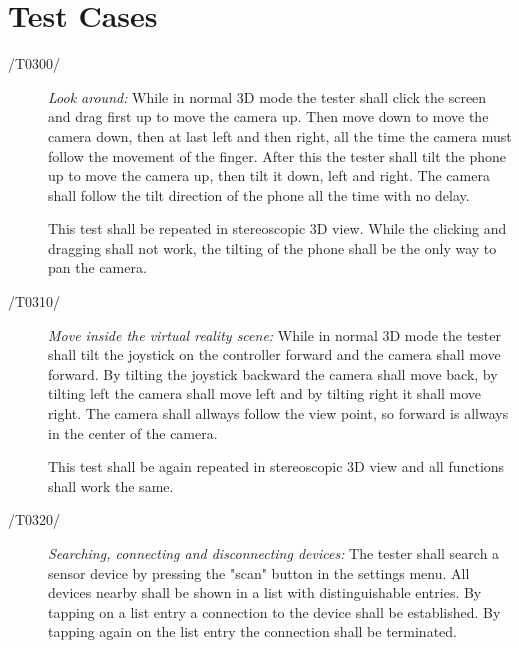 \section{Test Cases}





\begin{description}
  \item[/T0300/]
    \textit{Look around:} While in normal 3D mode the tester shall click the screen and drag first up to move the camera up.
    Then move down to move the camera down, then at last left and then right, all the time the camera must follow the movement of the finger.
    After this the tester shall tilt the phone up to move the camera up, then tilt it down, left and right. The camera shall follow the tilt direction of the phone all the time with no delay.

    This test shall be repeated in stereoscopic 3D view. While the clicking and dragging shall not work, the tilting of the phone shall be the only way to pan the camera.
\end{description}

\begin{description}
  \item[/T0310/]
    \textit{Move inside the virtual reality scene:} While in normal 3D mode the tester shall tilt the joystick on the controller forward and the camera shall move forward.
    By tilting the joystick backward the camera shall move back, by tilting left the camera shall move left and by tilting right it shall move right.
    The camera shall allways follow the view point, so forward is allways in the center of the camera.

    This test shall be again repeated in stereoscopic 3D view and all functions shall work the same.
\end{description}

\begin{description}
	\item[/T0320/]
	\textit{Searching, connecting and disconnecting devices:} The tester shall search a sensor device by pressing the "scan" button in the settings menu. All devices nearby shall be shown in a list with distinguishable entries. By tapping on a list entry a connection to the device shall be established.
	By tapping again on the list entry the connection shall be terminated.
\end{description}

